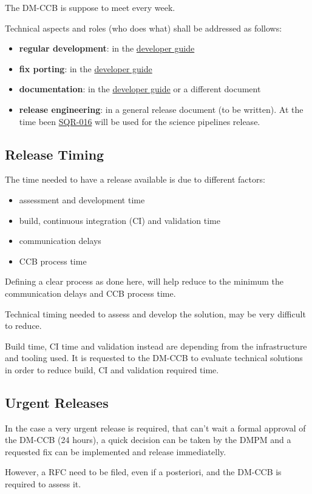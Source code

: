 The DM-CCB is suppose to meet every week.

Technical aspects and roles (who does what) shall be addressed as follows:

\begin{itemize}
\item {\bf regular development}: in the \href{https://developer.lsst.io/}{developer guide}
\item {\bf fix porting}: in the \href{https://developer.lsst.io/}{developer guide}
\item {\bf documentation}: in the \href{https://developer.lsst.io/}{developer guide} or a different document
\item {\bf release engineering}: in a general release document (to be written). At the time been \href{https://sqr-016.lsst.io/}{SQR-016} will be used for the science pipelines release.
\end{itemize}

\subsection{Release Timing}

The time needed to have a release available is due to different factors:

\begin{itemize}
\item assessment and development time
\item build, continuous integration (CI) and validation time
\item communication delays
\item CCB process time
\end{itemize}

Defining a clear process as done here, will help reduce to the minimum the communication delays and CCB process time.

Technical timing needed to assess and develop the solution, may be very difficult to reduce.

Build time, CI time and validation instead are depending from the infrastructure and tooling used. 
It is requested to the DM-CCB to evaluate technical solutions in order to reduce build, CI and validation required time.

\subsection{Urgent Releases}

In the case a very urgent release is required, that can't wait a formal approval of the DM-CCB (24 hours), a quick decision can be taken by the DMPM and a requested fix can be implemented and release immediatelly.

However, a RFC need to be filed, even if a posteriori, and the DM-CCB is required to assess it.

